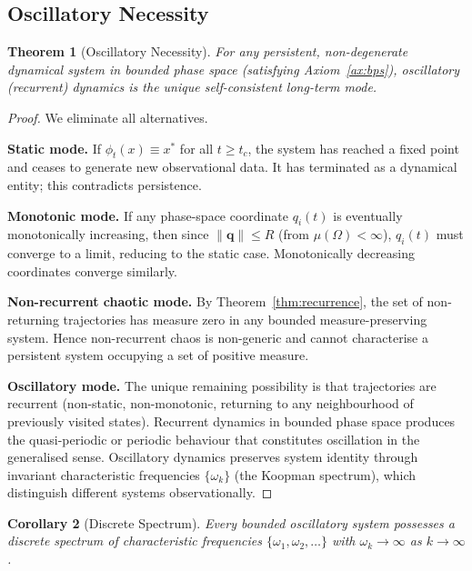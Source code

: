 \documentclass[11pt,twocolumn,a4paper]{article}
\newtheorem{theorem}{Theorem}[section]
\newtheorem{corollary}[theorem]{Corollary}
\theoremstyle{definition}
\theoremstyle{remark}
\begin{document}
\subsection{Oscillatory Necessity}

\begin{theorem}[Oscillatory Necessity]
\label{thm:oscillatory}
For any persistent, non-degenerate dynamical system in bounded phase space
(satisfying Axiom~\ref{ax:bps}), oscillatory (recurrent) dynamics is the
unique self-consistent long-term mode.
\end{theorem}

\begin{proof}
We eliminate all alternatives.

\textbf{Static mode.} If $\phi_t(x) \equiv x^*$ for all $t \geq t_c$, the system
has reached a fixed point and ceases to generate new observational data.
It has terminated as a dynamical entity; this contradicts persistence.

\textbf{Monotonic mode.} If any phase-space coordinate $q_i(t)$ is eventually
monotonically increasing, then since $\|\mathbf{q}\| \leq R$ (from $\mu(\Omega)
< \infty$), $q_i(t)$ must converge to a limit, reducing to the static case.
Monotonically decreasing coordinates converge similarly.

\textbf{Non-recurrent chaotic mode.} By Theorem~\ref{thm:recurrence}, the set
of non-returning trajectories has measure zero in any bounded
measure-preserving system. Hence non-recurrent chaos is non-generic and
cannot characterise a persistent system occupying a set of positive measure.

\textbf{Oscillatory mode.} The unique remaining possibility is that trajectories
are recurrent (non-static, non-monotonic, returning to any neighbourhood
of previously visited states). Recurrent dynamics in bounded phase space
produces the quasi-periodic or periodic behaviour that constitutes oscillation
in the generalised sense. Oscillatory dynamics preserves system identity through
invariant characteristic frequencies $\{\omega_k\}$ (the Koopman spectrum),
which distinguish different systems observationally.
\end{proof}

\begin{corollary}[Discrete Spectrum]
\label{cor:spectrum}
Every bounded oscillatory system possesses a discrete spectrum of
characteristic frequencies $\{\omega_1, \omega_2, \ldots\}$ with
$\omega_k \to \infty$ as $k \to \infty$.
\end{corollary}
\end{document}
